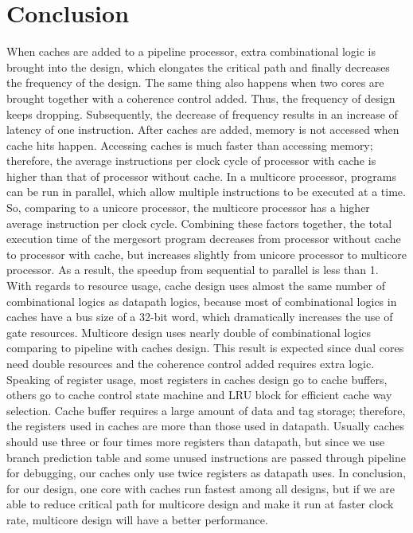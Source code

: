 \documentclass[12pt]{article}
\begin{document}
  \section{Conclusion}

  When caches are added to a pipeline processor, extra combinational logic is brought into the design, which elongates the critical path and finally decreases the frequency of the design. The same thing also happens when two cores are brought together with a coherence control added. Thus, the frequency of design keeps dropping. Subsequently, the decrease of frequency results in an increase of latency of one instruction. After caches are added, memory is not accessed when cache hits happen. Accessing caches is much faster than accessing memory; therefore, the average instructions per clock cycle of processor with cache is higher than that of processor without cache. In a multicore processor, programs can be run in parallel, which allow multiple instructions to be executed at a time. So, comparing to a unicore processor, the multicore processor has a higher average instruction per clock cycle. Combining these factors together, the total execution time of the mergesort program decreases from processor without cache to processor with cache, but increases slightly from unicore processor to multicore processor. As a result, the speedup from sequential to parallel is less than 1. \\ With regards to resource usage, cache design uses almost the same number of combinational logics as datapath logics, because most of combinational logics in caches have a bus size of a 32-bit word, which dramatically increases the use of gate resources. Multicore design uses nearly double of combinational logics comparing to pipeline with caches design. This result is expected since dual cores need double resources and the coherence control added requires extra logic. Speaking of register usage, most registers in caches design go to cache buffers, others go to cache control state machine and LRU block for efficient cache way selection. Cache buffer requires a large amount of data and tag storage; therefore, the registers used in caches are more than those used in datapath. Usually caches should use three or four times more registers than datapath, but since we use branch prediction table and some unused instructions are passed through pipeline for debugging, our caches only use twice registers as datapath uses. In conclusion, for our design, one core with caches run fastest among all designs, but if we are able to reduce critical path for multicore design and make it run at faster clock rate, multicore design will have a better performance.
\end{document}
